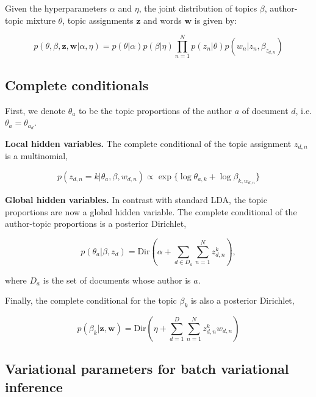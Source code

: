 Given the hyperparameters $\alpha$ and $\eta$, the joint distribution of topics $\beta$, author-topic mixture $\theta$, topic assignments $\mathbf{z}$ and words $\mathbf{w}$ is given by:

\begin{equation}
p(\theta,\beta,\mathbf{z},\mathbf{w}|\alpha,\eta) = p(\theta|\alpha) p(\beta|\eta) \prod_{n=1}^{N}{p(z_n|\theta)p(w_n|z_n,\beta_{z_{d,n}})}
\end{equation}


\subsection{Complete conditionals}

First, we denote $\theta_a$ to be the topic proportions of the author $a$ of document $d$, i.e. $\theta_a = \theta_{a_d}$.

\textbf{Local hidden variables.} The complete conditional of the topic assignment $z_{d,n}$ is a multinomial,

\begin{equation}
p(z_{d,n} = k | \theta_a, \beta, w_{d,n}) \propto \exp \{ \log \theta_{a,k} + \log \beta_{k,w_{d,n}} \}
\end{equation}

\textbf{Global hidden variables.} In contrast with standard LDA, the topic proportions are now a global hidden variable.
The complete conditional of the author-topic proportions is a posterior Dirichlet,

\begin{equation}
p(\theta_a | \beta, z_{d}) = \text{Dir} ( \alpha + \sum_{d \in D_a}{\sum_{n=1}^{N}{z^k_{d,n}}}),
\end{equation}

\noindent where $D_a$ is the set of documents whose author is $a$.

Finally, the complete conditional for the topic $\beta_k$ is also a posterior Dirichlet,

\begin{equation}
p(\beta_k | \mathbf{z}, \mathbf{w}) = \text{Dir} ( \eta + \sum_{d=1}^{D}{\sum_{n=1}^{N}{z^k_{d,n}w_{d,n}}})
\end{equation}



\subsection{Variational parameters for batch variational inference}

